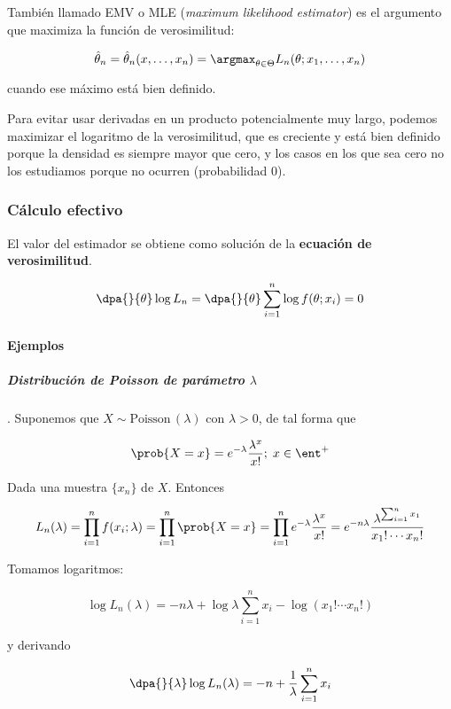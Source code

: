 \documentclass{apuntes}
\begin{document}
\begin{defn} También llamado EMV o MLE (\textit{maximum likelihood estimator}) es el argumento que maximiza la función de verosimilitud:

\[ \hat{\theta}_n = \hat{\theta}_n(x,\dotsc,x_n) = \argmax_{\theta\in\Theta} L_n(\theta;x_1,\dotsc,x_n) \]

cuando ese máximo está bien definido.
\end{defn}

Para evitar usar derivadas en un producto potencialmente muy largo, podemos maximizar el logaritmo de la verosimilitud, que es creciente y está bien definido porque la densidad es siempre mayor que cero, y los casos en los que sea cero no los estudiamos porque no ocurren (probabilidad 0).

\subsubsection{Cálculo efectivo}

El valor del estimador se obtiene como solución de la  \textbf{ecuación de verosimilitud}.

\[ \dpa{}{\theta}\log L_n = \dpa{}{\theta}\sum_{i=1}^n\log f(\theta;x_i) = 0 \]

\paragraph{Ejemplos}

\subparagraph{Distribución de Poisson de parámetro $\lambda$}. Suponemos que $X\sim \text{Poisson}\,(\lambda)$ con $\lambda > 0$, de tal forma que

\[ \prob{X = x} = e ^{-\lambda}\frac{\lambda^x}{x!}; \; x\in \ent^+ \]

Dada una muestra $\{x_n\}$ de $X$. Entonces

\[ L_n(\lambda) = \prod_{i=1}^n f(x_i;\lambda) = \prod_{i=1}^n \prob{X=x} = \prod_{i=1}^n e ^{-\lambda}\frac{\lambda^x}{x!} = e^{-n\lambda}\frac{\lambda^{\sum_{i=1}^nx_1}}{x_1!\dotsb x_n!} \]

Tomamos logaritmos:

\[ \log  L_n(\lambda) = -n\lambda + \log\lambda \sum_{i=1}^n x_i- \log\left(x_1!\dotsb x_n!\right) \]

y derivando

\[ \dpa{}{\lambda}\log  L_n(\lambda)  = -n +\frac{1}{\lambda} \sum_{i=1}^n x_i \]
\end{document}
